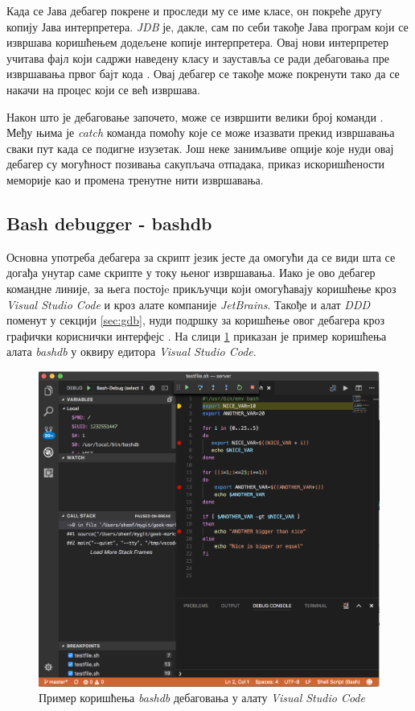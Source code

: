 \documentclass[a4paper]{article}
\begin{document}
Када се Јава дебагер покрене и проследи му се име класе, 
он покреће другу копију Јава интерпретера. {\em JDB} је, дакле,
сам по себи такође Јава програм који се извршава коришћењем
додељене копије интерпретера. Овај нови интерпретер учитава фајл који
садржи наведену класу и зауставља се ради дебаговања пре извршавања првог
бајт кода \cite[Chapter 16]{javaInANutshell}. Овај дебагер се такође може
покренути тако да се накачи на процес који се већ извршава.

Након што је дебаговање започето, може се извршити велики број команди 
\cite[Chapter 16]{javaInANutshell}.
Међу њима је {\em catch} команда помоћу које се може изазвати прекид извршавања сваки
пут када се подигне изузетак. Још неке занимљиве опције које нуди овај
дебагер су могућност позивања сакупљача отпадака, приказ искоришћености меморије
као и промена тренутне нити извршавања.

\subsection{Bash debugger - bashdb}

Основна употреба дебагера за скрипт језик јесте да омогући
да се види шта се догађа унутар саме скрипте у току њеног извршавања.
Иако је ово дебагер командне линије, за њега постојe прикључци 
који омогућавају коришћење кроз {\em Visual Studio Code} и 
кроз алате компаније {\em JetBrains}. Такође и алат {\em DDD} поменут у секцији
\ref{sec:gdb}, нуди подршку за коришћење овог дебагера кроз графички кориснички
интерфејс \cite{bashDB}. На слици \ref{fig:bashdbVscode} приказан је пример коришћења алата {\em bashdb}
у оквиру едитора {\em Visual Studio Code}.

\begin{figure}
    \begin{center}
        \includegraphics[scale=0.17]{slike/bashdb_vscode.png}
    \end{center}
    \caption{Пример коришћења {\em bashdb} дебаговања у алату {\em Visual Studio Code}}
    \label{fig:bashdbVscode}
\end{figure}
\end{document}
